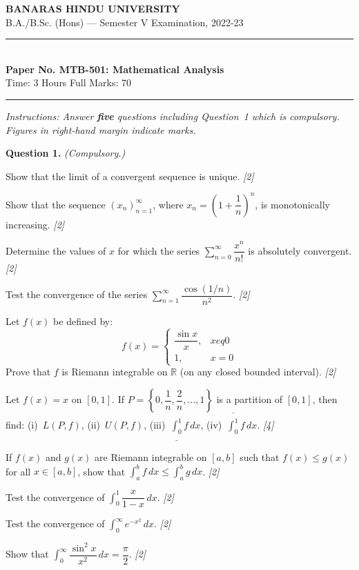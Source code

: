 \documentclass[11pt,a4paper]{article}
\newcommand{\pts}[1]{\hfill   \textit{[#1]}}
\begin{document}
\begin{center}
  {\large\bfseries BANARAS HINDU UNIVERSITY}\\[2pt]
  {\normalsize B.A./B.Sc. (Hons) --- Semester V Examination, 2022-23}\\[6pt]
  \rule{0.8\linewidth}{0.5pt}\\[6pt]
  {\large\bfseries Paper No. MTB-501: Mathematical Analysis}\\[4pt]
  {\normalsize Time: 3 Hours \hfill Full Marks: 70}
\end{center}
\rule{\linewidth}{0.4pt}
\smallskip



\noindent   \textit{Instructions: Answer   \textbf{five} questions including Question~1 which is compulsory. Figures in right-hand margin indicate marks.}
\bigskip




\noindent   \textbf{Question 1.}   \textit{(Compulsory.)}

\begin{parts}
  \item Show that the limit of a convergent sequence is unique. \pts{2}
  \item Show that the sequence $(x_n)_{n=1}^\infty$, where $x_n = \left(1 + \dfrac{1}{n}\right)^n$, is monotonically increasing. \pts{2}
  \item Determine the values of $x$ for which the series $\sum_{n=0}^\infty \dfrac{x^n}{n!}$ is absolutely convergent. \pts{2}
  \item Test the convergence of the series $\sum_{n=1}^\infty \dfrac{\cos(1/n)}{n^2}$. \pts{2}
  \item Let $f(x)$ be defined by:
  \[
  f(x) = 
\begin{cases} \dfrac{\sin x}{x}, & x 
eq 0 \\ 1, & x = 0 \end{cases}
  \]
  Prove that $f$ is Riemann integrable on $\mathbb{R}$ (on any closed bounded interval). \pts{2}
  \item Let $f(x) = x$ on $[0,1]$. If $P = \left\{0, \dfrac{1}{n}, \dfrac{2}{n}, \dots, 1\right\}$ is a partition of $[0,1]$, then find: (i)~$L(P, f)$, (ii)~$U(P, f)$, (iii)~$\underline{\int_0^1} f\,dx$, (iv)~$\overline{\int_0^1} f\,dx$. \pts{4}
  \item If $f(x)$ and $g(x)$ are Riemann integrable on $[a, b]$ such that $f(x) \le g(x)$ for all $x \in [a, b]$, show that $\int_a^b f\,dx \le \int_a^b g\,dx$. \pts{2}
  \item Test the convergence of $\int_0^1 \dfrac{x}{1-x}\,dx$. \pts{2}
  \item Test the convergence of $\int_0^\infty e^{-x^2}\,dx$. \pts{2}
  \item Show that $\int_0^\infty \dfrac{\sin^2 x}{x^2}\,dx = \dfrac{\pi}{2}$. \pts{2}
\end{parts}
\end{document}
